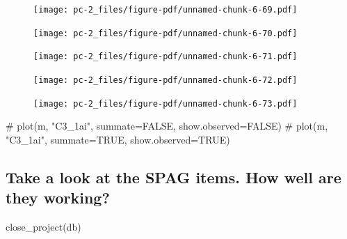 \documentclass[
  letterpaper,
  DIV=11,
  numbers=noendperiod]{scrreprt}
\newenvironment{Shaded}{\begin{snugshade}}{\end{snugshade}}
\newcommand{\CommentTok}[1]{\textcolor[rgb]{0.37,0.37,0.37}{#1}}
\newcommand{\FunctionTok}[1]{\textcolor[rgb]{0.28,0.35,0.67}{#1}}
\newcommand{\NormalTok}[1]{\textcolor[rgb]{0.00,0.23,0.31}{#1}}
\begin{document}
\begin{figure}[H]

{\centering \texttt{[image: pc-2\_files/figure-pdf/unnamed-chunk-6-69.pdf]}

}

\end{figure}

\begin{figure}[H]

{\centering \texttt{[image: pc-2\_files/figure-pdf/unnamed-chunk-6-70.pdf]}

}

\end{figure}

\begin{figure}[H]

{\centering \texttt{[image: pc-2\_files/figure-pdf/unnamed-chunk-6-71.pdf]}

}

\end{figure}

\begin{figure}[H]

{\centering \texttt{[image: pc-2\_files/figure-pdf/unnamed-chunk-6-72.pdf]}

}

\end{figure}

\begin{figure}[H]

{\centering \texttt{[image: pc-2\_files/figure-pdf/unnamed-chunk-6-73.pdf]}

}

\end{figure}

\begin{Shaded}
\begin{Highlighting}[]
\CommentTok{\# plot(m, "C3\_1ai", summate=FALSE, show.observed=FALSE)}
\CommentTok{\# plot(m, "C3\_1ai", summate=TRUE, show.observed=TRUE)}
\end{Highlighting}
\end{Shaded}

\hypertarget{take-a-look-at-the-spag-items.-how-well-are-they-working}{%
\subsection{Take a look at the SPAG items. How well are they
working?}\label{take-a-look-at-the-spag-items.-how-well-are-they-working}}

\begin{Shaded}
\begin{Highlighting}[]
\FunctionTok{close\_project}\NormalTok{(db)}
\end{Highlighting}
\end{Shaded}
\end{document}
